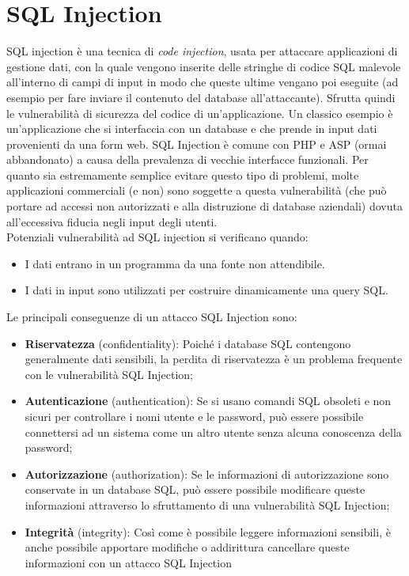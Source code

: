 \chapter{SQL Injection}

SQL injection è una tecnica di \textit{code injection}, usata per attaccare
applicazioni di gestione
dati, con la quale vengono inserite delle stringhe di codice SQL malevole
all'interno di campi
di input in modo che queste ultime vengano poi eseguite
(ad esempio per fare inviare il contenuto del database all'attaccante).
Sfrutta quindi le vulnerabilità di sicurezza del codice
di un'applicazione. Un classico esempio è un'applicazione che si interfaccia
con un database
e che prende in input dati provenienti da una form web.
SQL Injection è comune con PHP e ASP (ormai abbandonato) a causa della
prevalenza di
vecchie interfacce funzionali.
Per quanto sia estremamente semplice evitare questo tipo di problemi,
molte applicazioni
commerciali (e non) sono soggette a questa vulnerabilità
(che può portare ad accessi non
autorizzati e alla distruzione di database aziendali) dovuta all'eccessiva
fiducia negli input
degli utenti.\\

Potenziali vulnerabilità ad SQL injection si verificano quando:

\begin{itemize}
    \item I dati entrano in un programma da una fonte non attendibile.
    \item I dati in input sono utilizzati per costruire
          dinamicamente una query SQL.
\end{itemize}

Le principali conseguenze di un attacco SQL Injection sono:

\begin{itemize}
    \item \textbf{Riservatezza} (confidentiality):
          Poiché i database SQL contengono generalmente dati
          sensibili, la perdita di riservatezza è un problema frequente con le
          vulnerabilità SQL
          Injection;
    \item \textbf{Autenticazione} (authentication): Se si usano comandi SQL
          obsoleti e non sicuri per controllare i
          nomi utente e le password, può essere possibile connettersi ad un sistema
          come un
          altro utente senza alcuna conoscenza della password;
    \item \textbf{Autorizzazione} (authorization): Se le informazioni di
          autorizzazione sono conservate
          in un database SQL, può essere possibile modificare queste informazioni
          attraverso
          lo sfruttamento di una vulnerabilità SQL Injection;
    \item \textbf{Integrità} (integrity): Così come è possibile leggere
          informazioni sensibili, è anche
          possibile apportare modifiche o addirittura cancellare queste informazioni
          con un
          attacco SQL Injection
\end{itemize}

